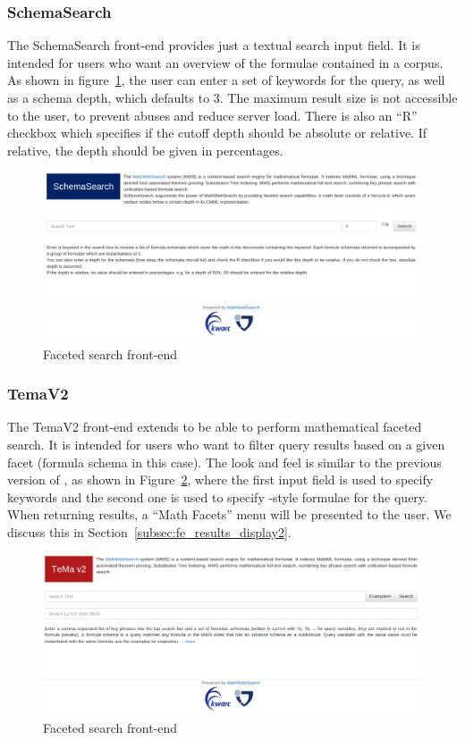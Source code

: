 \subsubsection{SchemaSearch}
The \textsf{SchemaSearch} front-end provides just a textual search input field.
It is intended for users who want an overview of the formulae contained in a
corpus.
As shown in figure~\ref{fig:frontend_schema}, the user can enter a set of keywords for
the query, as well as a schema depth, which defaults to 3. The maximum result
size is not accessible to the user, to prevent abuses and reduce server load.
There is also an ``R'' checkbox which specifies if the cutoff depth should be
absolute or relative. If relative, the depth should be given in percentages.

\begin{figure}[ht]\centering
    \includegraphics[width=12.8cm]{img/frontend_schema.png}
    \caption{Faceted search front-end}\label{fig:frontend_schema}
\end{figure}
\FloatBarrier

\subsubsection{TemaV2}
The \textsf{TemaV2} front-end extends \tms to be able to perform mathematical
faceted search. It is intended for users who want to filter query results based
on a given facet (formula schema in this case).
The look and feel is similar to the previous version of \tms,
as shown in Figure~\ref{fig:frontend_temaV2}, where the first input field is
used to specify keywords and the second one is used to specify \latex-style
formulae for the query. When returning results, a ``Math Facets'' menu will be
presented to the user. We discuss this in
Section~\ref{subsec:fe_results_display2}.

\begin{figure}[ht]\centering
    \includegraphics[width=12.8cm]{img/frontend_temaV2.png}
    \caption{Faceted search front-end}\label{fig:frontend_temaV2}
\end{figure}
\FloatBarrier

